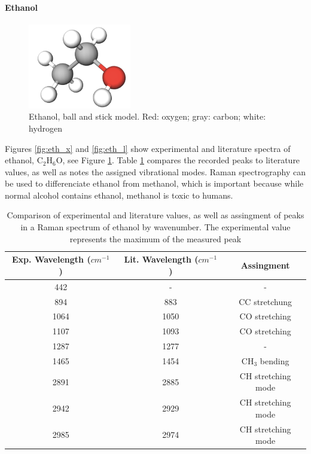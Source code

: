    \newpage

\paragraph{Ethanol}

    \begin{figure} %
        \centering
        \vspace{-20pt}
        \includegraphics[width=0.4\textwidth]{images/raman_spectra/eth_i.png}
        \caption{Ethanol, ball and stick model. Red: oxygen; gray: carbon; white: hydrogen}
        \label{fig:eth_i}
    \end{figure}


    Figures \ref{fig:eth_x} and \ref{fig:eth_l} show experimental and literature spectra of ethanol, C\(_2\)H\(_6\)O, see Figure \ref{fig:eth_i}.  Table \ref{table:eth} compares the recorded peaks to literature values, as well as notes the assigned vibrational modes. Raman spectrography can be used to differenciate ethanol from methanol, which is important because while normal alcohol contains ethanol, methanol is toxic to humans.

    \begin{table}[h]
    \begin{center}
        \vspace{15pt}
        \begin{tabular}{|c|c|c|}
         \hline
         Exp. Wavelength (\( cm^{-1} \) ) & Lit. Wavelength  (\( cm^{-1} \) ) & Assingment  \\ 
         \hline
         442 & - & - \\
         894 & 883 & CC stretchung \\ 
         1064 & 1050 & CO stretching\\
         1107 & 1093 & CO stretching\\
         1287 & 1277 & - \\
         1465 & 1454 & CH\(_3\) bending\\
         2891& 2885 &  CH stretching mode\\
         2942 & 2929 & CH stretching mode\\
         2985 & 2974 & CH stretching mode\\
         
         \hline
        \end{tabular}
        \caption{Comparison of experimental and literature \cite{ethl1} \cite{ethl2} values, as well as assingment of peaks in a Raman spectrum of ethanol by wavenumber. The experimental value represents the maximum of the measured peak }
        \label{table:eth}
    \end{center}
    \end{table}

